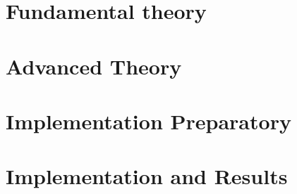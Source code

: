 
	
    
    
    
    \part{Fundamental theory}
    
    
    
    
    \part{Advanced Theory}
    
    
    
    
    \part{Implementation Preparatory}
    
    
 
 	\part{Implementation and Results}
    
    
    
    
    \appendix
    
    
    
    
    
    \newpage
    \nocite{*}
    \printbibliography

